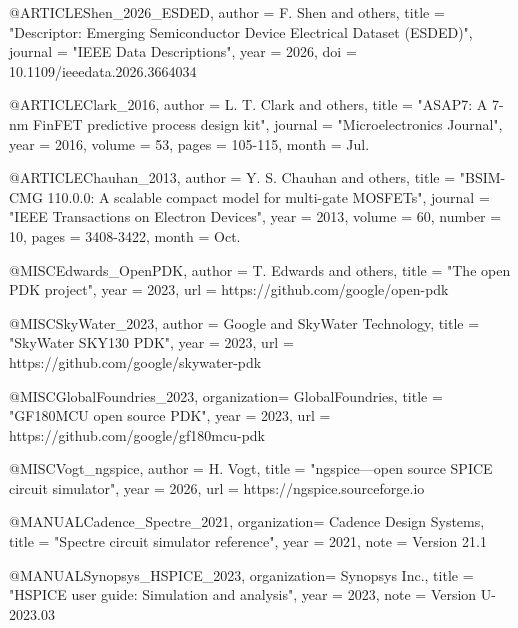 \documentclass[conference]{IEEEtran}
\begin{document}
@ARTICLE{Shen_2026_ESDED,
    author      =   {F. {Shen} and others},
    title       =   "{Descriptor: Emerging Semiconductor Device Electrical Dataset ({ESDED})}",
    journal     =   "{IEEE Data Descriptions}",
    year        =   {2026},
    doi         =   {10.1109/ieeedata.2026.3664034}
}

@ARTICLE{Clark_2016,
    author      =   {L. T. {Clark} and others},
    title       =   "{ASAP7: A 7-nm FinFET predictive process design kit}",
    journal     =   "{Microelectronics Journal}",
    year        =   {2016},
    volume      =   {53},
    pages       =   {105-115},
    month       =   {Jul.}
}

@ARTICLE{Chauhan_2013,
    author      =   {Y. S. {Chauhan} and others},
    title       =   "{BSIM-CMG 110.0.0: A scalable compact model for multi-gate {MOSFETs}}",
    journal     =   "{IEEE Transactions on Electron Devices}",
    year        =   {2013},
    volume      =   {60},
    number      =   {10},
    pages       =   {3408-3422},
    month       =   {Oct.}
}

@MISC{Edwards_OpenPDK,
    author      =   {T. {Edwards} and others},
    title       =   "{The open {PDK} project}",
    year        =   {2023},
    url         =   {https://github.com/google/open-pdk}
}

@MISC{SkyWater_2023,
    author      =   {{Google} and {SkyWater Technology}},
    title       =   "{SkyWater SKY130 {PDK}}",
    year        =   {2023},
    url         =   {https://github.com/google/skywater-pdk}
}

@MISC{GlobalFoundries_2023,
    organization=   {GlobalFoundries},
    title       =   "{GF180MCU open source {PDK}}",
    year        =   {2023},
    url         =   {https://github.com/google/gf180mcu-pdk}
}


@MISC{Vogt_ngspice,
    author      =   {H. {Vogt}},
    title       =   "{ngspice---open source {SPICE} circuit simulator}",
    year        =   {2026},
    url         =   {https://ngspice.sourceforge.io}
}

@MANUAL{Cadence_Spectre_2021,
    organization=   {Cadence Design Systems},
    title       =   "{Spectre circuit simulator reference}",
    year        =   {2021},
    note        =   {Version 21.1}
}

@MANUAL{Synopsys_HSPICE_2023,
    organization=   {Synopsys Inc.},
    title       =   "{HSPICE user guide: Simulation and analysis}",
    year        =   {2023},
    note        =   {Version U-2023.03}
}
\end{document}

